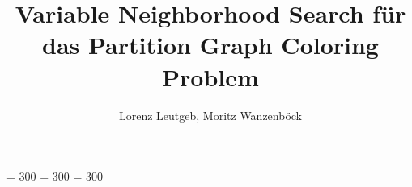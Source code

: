 \usepackage[utf8]{inputenc}
\usepackage[ngerman]{babel}
\usepackage[T1]{fontenc}
\usepackage[babel, german=quotes]{csquotes}
\usepackage[style=authoryear, natbib, backend=biber]{biblatex}
\usepackage[top=3cm,bottom=3cm,left=2cm,right=2cm]{geometry}
\usepackage{listings}
\usepackage{hyperref}
\usepackage{graphicx, fancyhdr, array, wrapfig, colortbl, algorithm, algpseudocode, subcaption, setspace}
\usepackage[usenames,dvipsnames]{xcolor}
\renewcommand{\listalgorithmname}{Algorithmenverzeichnis}
\renewcommand{\algorithmicend}{\textbf{Ende}}
\renewcommand{\algorithmicif}{\textbf{Falls}}
\renewcommand{\algorithmicthen}{\textbf{dann}}
\renewcommand{\algorithmicelse}{\textbf{Sonst}}
\renewcommand{\algorithmicdo}{\textbf{}}
\renewcommand{\algorithmicwhile}{\textbf{Solange}}
\renewcommand{\algorithmicreturn}{\textbf{Returniere}}
\renewcommand{\algorithmicrequire}{\textbf{Eingabe}}
\renewcommand{\algorithmicensure}{\textbf{Ausgabe}}
\renewcommand{\algorithmicforall}{\textbf{Für alle}}
\renewcommand{\algorithmicfor}{\textbf{Für}}

\lstset{style=customc}
\linespread{1.5}
\setlength{\parindent}{4mm}
\setlength{\parskip}{2mm}
\pagestyle{fancy}
\fancyhf{}
\clubpenalty = 300
\widowpenalty = 300
\displaywidowpenalty = 300
\fancyfoot{}
\renewcommand{\footrulewidth}{0.4pt}
\rfoot{{\footnotesize \textnormal{\thepage}}}
\lhead{{\footnotesize \textnormal{}}}
\lfoot{{\footnotesize \textnormal{\the\year}}}

\let\origappendix\appendix
\renewcommand\appendix{\clearpage\pagenumbering{roman}\origappendix}
\renewcommand{\lstlistlistingname}{Codeverzeichnis}

\title{Variable Neighborhood Search für das Partition Graph Coloring Problem}
\author{Lorenz Leutgeb, Moritz Wanzenböck}
